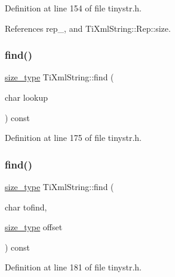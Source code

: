 Definition at line 154 of file tinystr.\+h.



References rep\+\_\+, and Ti\+Xml\+String\+::\+Rep\+::size.

\hypertarget{class_ti_xml_string_a22fc54a23c5a0ab771331a25a769516e}{}\label{class_ti_xml_string_a22fc54a23c5a0ab771331a25a769516e} 
\subsubsection{\texorpdfstring{find()}{find()}\hspace{0.1cm}{\footnotesize\ttfamily [1/2]}}
{\footnotesize\ttfamily \hyperlink{class_ti_xml_string_abeb2c1893a04c17904f7c06546d0b971}{size\+\_\+type} Ti\+Xml\+String\+::find (\begin{DoxyParamCaption}\item[{char}]{lookup }\end{DoxyParamCaption}) const\hspace{0.3cm}{\ttfamily [inline]}}



Definition at line 175 of file tinystr.\+h.

\hypertarget{class_ti_xml_string_a2d66cfd6986faceda62ca62db553a921}{}\label{class_ti_xml_string_a2d66cfd6986faceda62ca62db553a921} 
\subsubsection{\texorpdfstring{find()}{find()}\hspace{0.1cm}{\footnotesize\ttfamily [2/2]}}
{\footnotesize\ttfamily \hyperlink{class_ti_xml_string_abeb2c1893a04c17904f7c06546d0b971}{size\+\_\+type} Ti\+Xml\+String\+::find (\begin{DoxyParamCaption}\item[{char}]{tofind,  }\item[{\hyperlink{class_ti_xml_string_abeb2c1893a04c17904f7c06546d0b971}{size\+\_\+type}}]{offset }\end{DoxyParamCaption}) const\hspace{0.3cm}{\ttfamily [inline]}}



Definition at line 181 of file tinystr.\+h.



